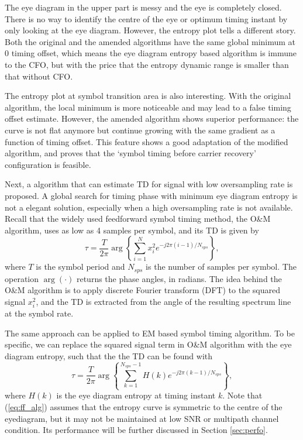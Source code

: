 \documentclass[journal,comsoc,onecolumn, 12pt,draftclsnofoot]{IEEEtran}
\begin{document}
The eye diagram in the upper part is messy and the eye is completely closed. 
There is no way to identify the centre of the eye or optimum timing instant by only looking at the eye diagram.
However, the entropy plot tells a different story.
Both the original and the amended algorithms have the same global minimum at 0 timing offset, which means the eye diagram entropy based algorithm is immune to the CFO,
but with the price that the entropy dynamic range is smaller than that without CFO.

The entropy plot at symbol transition area is also interesting.
With the original algorithm, the local minimum is more noticeable and may lead to a false timing offset estimate.
However, the amended algorithm shows superior performance:
the curve is not flat anymore but continue growing with the same gradient as a function of timing offset.
This feature shows a good adaptation of the modified algorithm, and proves that the `symbol timing before carrier recovery' configuration is feasible.

Next, a algorithm that can estimate TD for signal with low oversampling rate is proposed.
A global search for timing phase with minimum eye diagram entropy is not a elegant solution, especially when a high oversampling rate is not available.
Recall that the widely used feedforward symbol timing method, the O\&M algorithm, uses as low as 4 samples per symbol, and its TD is given by
\begin{equation}
\tau=\frac{T}{2\pi}\arg \left\{ {\sum\limits_{i = 1}^{N} {x_i^2{e^{ - j2\pi (i-1)/N_{sps}}}} } \right\},
\label{eq:om}
\end{equation}
where \(T\) is the symbol period and \(N_{sps}\) is the number of samples per symbol.
The operation \(\arg( \cdot )\) returns the phase angles, in radians.
The idea behind the O\&M algorithm is to apply discrete Fourier transform (DFT) to the squared signal \(x_i^2\),
and the TD is extracted from the angle of the resulting spectrum line at the symbol rate.

The same approach can be applied to EM based symbol timing algorithm.
To be specific, we can replace the squared signal term in O\&M algorithm with the eye diagram entropy,
such that the the TD can be found with
\begin{equation}
\tau  = \frac{T}{{2\pi }}\arg \left\{ {\sum\limits_{k = 1}^{N_{sps}-1} {H(k){e^{ - j2\pi (k-1)/N_{sps}}}} } \right\},
\label{eq:ff_alg}
\end{equation}
where \(H(k)\) is the eye diagram entropy at timing instant \(k\).
Note that (\ref{eq:ff_alg}) assumes that the entropy curve is symmetric to the centre of the eyediagram,
but it may not be maintained at  low SNR or multipath channel condition.
Its performance will be further discussed in Section \ref{sec:perfo}.
\end{document}
